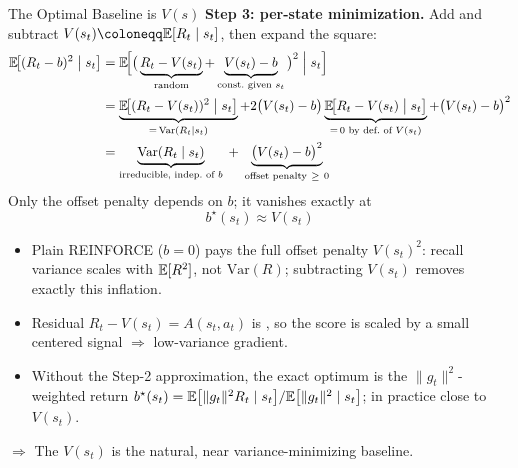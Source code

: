 \begin{frame}{The Optimal Baseline is $V(s)$}
  \textbf{Step 3: per-state minimization.} Add and subtract $V(s_t) \coloneqq \E[R_t \mid s_t]$, then expand the square:
  \begin{align*}
    \mathbb{E}\!\bigl[(R_t - b)^2 \bigm| s_t\bigr]
      &= \mathbb{E}\!\Bigl[\bigl(\,\underbrace{R_t - V(s_t)}_{\text{random}} + \underbrace{V(s_t) - b}_{\text{const.\ given } s_t}\,\bigr)^2 \Bigm| s_t\Bigr] \\
      &= \underbrace{\mathbb{E}\!\bigl[(R_t - V(s_t))^2 \bigm| s_t\bigr]}_{=\,\mathrm{Var}(R_t \mid s_t)}
        + 2\bigl(V(s_t) - b\bigr)\underbrace{\mathbb{E}\!\bigl[R_t - V(s_t) \bigm| s_t\bigr]}_{=\,0 \text{ by def.\ of } V(s_t)}
        + \bigl(V(s_t) - b\bigr)^2 \\
      &= \underbrace{\mathrm{Var}(R_t \mid s_t)}_{\text{irreducible, indep.\ of } b}
        \;+\; \underbrace{\bigl(V(s_t) - b\bigr)^2}_{\text{offset penalty} \ \ge\ 0}
  \end{align*}
  Only the offset penalty depends on $b$; it vanishes exactly at
  \[
    \boxed{\,b^\star(s_t) \approx V(s_t)\,}
  \]

  \begin{itemize}[nosep]
    \item Plain REINFORCE ($b=0$) pays the full offset penalty $V(s_t)^2$: recall variance scales with $\mathbb{E}[R^2]$, not $\mathrm{Var}(R)$; subtracting $V(s_t)$ removes exactly this inflation.
    \item Residual $R_t - V(s_t) = A(s_t,a_t)$ is , so the score is scaled by a small centered signal $\Rightarrow$ low-variance gradient.
    \item Without the Step-2 approximation, the exact optimum is the $\|g_t\|^2$-weighted return
      $b^\star(s_t) = \mathbb{E}\bigl[\|g_t\|^2 R_t \mid s_t\bigr] / \mathbb{E}\bigl[\|g_t\|^2 \mid s_t\bigr]$; in practice close to $V(s_t)$.
  \end{itemize}
  $\Rightarrow$ The  $V(s_t)$ is the natural, near variance-minimizing baseline.
\end{frame}


